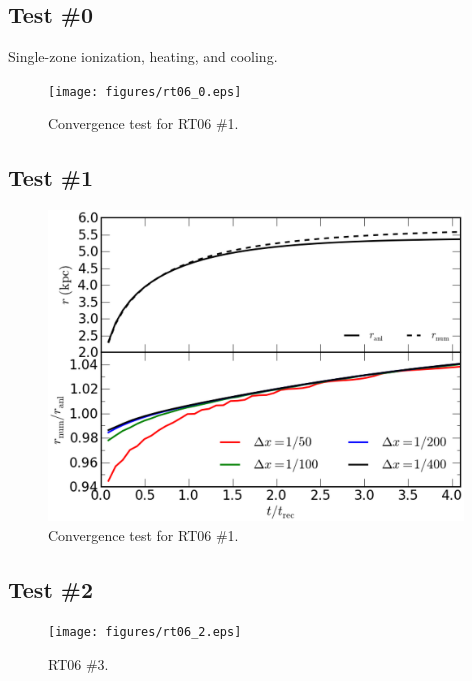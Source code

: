 \documentclass[letterpaper,titlepage,12pt]{article}
\numberwithin{equation}{section}
\begin{document}
\subsection{Test \#0}
Single-zone ionization, heating, and cooling.

\begin{figure}[htbp!]
\begin{center}
\texttt{[image: figures/rt06\_0.eps]}
\caption{Convergence test for RT06 \#1.}
\label{fig:RT06_1}
\end{center}
\end{figure}

\subsection{Test \#1}

\begin{figure}[htbp!]
\begin{center}
\includegraphics[width=0.98\textwidth]{figures/rt06_1_convergence.eps}
\caption{Convergence test for RT06 \#1.}
\label{fig:RT06_1}
\end{center}
\end{figure}

\subsection{Test \#2}

\begin{figure}[htbp!]
\begin{center}
\texttt{[image: figures/rt06\_2.eps]}
\caption{RT06 \#3.}
\label{fig:RT06_2}
\end{center}
\end{figure}
            
\end{document}
